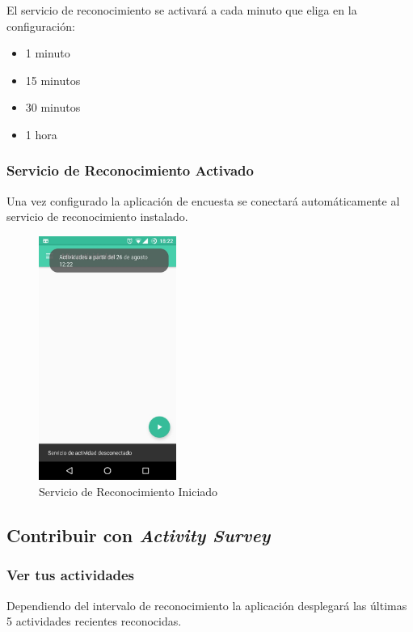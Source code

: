 {El servicio de reconocimiento se activará a cada minuto que eliga en la configuración:
\begin{itemize}
\item {} 
1 minuto

\item {} 
15 minutos

\item {} 
30 minutos

\item {} 
1 hora

\end{itemize}

\subsubsection{Servicio de Reconocimiento Activado}
\label{config:servicio-de-reconocimiento-activado}
Una vez configurado la aplicación de encuesta se conectará automáticamente al servicio de reconocimiento instalado.
\begin{figure}[h]
\centering

    \includegraphics[width=0.4\textwidth]{anexos/graphics/app_started.jpg}
\caption{Servicio de Reconocimiento Iniciado}\label{config:id3}\end{figure}


\subsection{Contribuir con \emph{Activity Survey}}
\label{contrib:har-contrib}\label{contrib::doc}\label{contrib:contribuir-con-activity-survey}

\subsubsection{Ver tus actividades}
\label{contrib:ver-tus-actividades}
Dependiendo del intervalo de reconocimiento la aplicación desplegará las últimas 5 actividades recientes
reconocidas.

}
